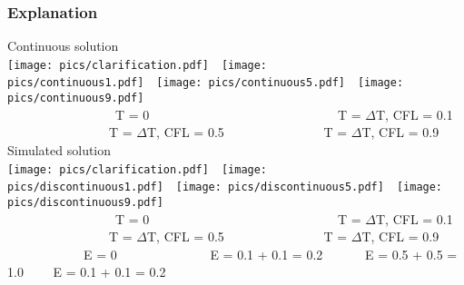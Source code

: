 \documentclass[10pt]{beamer}
\begin{document}
\begin{frame}
\frametitle{Explanation} 
\vspace{-0.1in}
Continuous solution\\
\texttt{[image: pics/clarification.pdf]}\ \  
\texttt{[image: pics/continuous1.pdf]}\ \ 
\texttt{[image: pics/continuous5.pdf]}\ \ 
\texttt{[image: pics/continuous9.pdf]}\\
{\tiny\ \ \ \ \ \ \ \ \ \ \ \ \ \ \ \ \ T = 0 \ \ \ \ \ \ \ \ \ \ \ \ \ \ \ \ \ \ \ \ \ \ \ \ \ \ \ \ \ T = $\Delta$T, CFL = 0.1 \ \ \ \ \ \ \ \ \ \ \ \ \ \ \ \ T = $\Delta$T, CFL = 0.5 \ \ \ \ \ \ \ \ \ \ \ \ \ \ \ T = $\Delta$T, CFL = 0.9\\}
Simulated solution\\
\texttt{[image: pics/clarification.pdf]}\ \ 
\texttt{[image: pics/discontinuous1.pdf]}\ \ 
\texttt{[image: pics/discontinuous5.pdf]}\ \ 
\texttt{[image: pics/discontinuous9.pdf]}\\
{\tiny\ \ \ \ \ \ \ \ \ \ \ \ \ \ \ \ \ T = 0 \ \ \ \ \ \ \ \ \ \ \ \ \ \ \ \ \ \ \ \ \ \ \ \ \ \ \ \ \ T = $\Delta$T, CFL = 0.1 \ \ \ \ \ \ \ \ \ \ \ \ \ \ \ \ T = $\Delta$T, CFL = 0.5 \ \ \ \ \ \ \ \ \ \ \ \ \ \ \ T = $\Delta$T, CFL = 0.9\\}
\pause
{\scriptsize\ \ \ \ \ \ \ \ \ \ \ \ E = 0 \ \ \ \ \ \ \ \ \ \ \ \ \ \ E = 0.1 + 0.1 = 0.2 \ \ \ \ \ \ E = 0.5 + 0.5 = 1.0 \ \ \ \ E = 0.1 + 0.1 = 0.2}
\end{frame}



\end{document}
